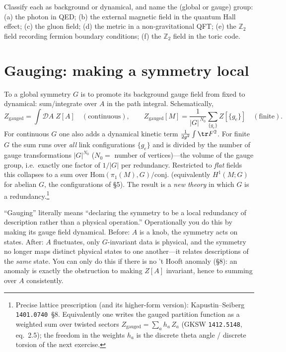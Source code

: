 \documentclass[11pt]{article}
\newcommand{\Ztwo}{\mathbb{Z}_2}
\begin{document}
\begin{xca}
Classify each as background or dynamical, and name the (global or gauge) group:
(a) the photon in QED; (b) the external magnetic field in the quantum Hall effect;
(c) the gluon field; (d) the metric in a non-gravitational QFT; (e) the $\Ztwo$ field
recording fermion boundary conditions; (f) the $\Ztwo$ field in the toric code.
\end{xca}

\section{Gauging: making a symmetry local}

\begin{ddefinition}[Gauging]
To  a global symmetry $G$ is to promote its background gauge field from
fixed to dynamical: sum/integrate over $A$ in the path integral. Schematically,
\[
Z_{\text{gauged}} = \int \mathcal D A \; Z[A]
\quad(\text{continuous}),
\qquad
Z_{\text{gauged}}[M] = \frac{1}{|G|^{\,N_0}}\sum_{\{g_e\}} Z[\{g_e\}]
\quad(\text{finite}).
\]
For continuous $G$ one also adds a dynamical kinetic term $\frac1{2g^2}\int\tr F^2$. For
finite $G$ the sum runs over \emph{all} link configurations $\{g_e\}$ and is divided by
the number of gauge transformations $|G|^{N_0}$ ($N_0=$ number of vertices)---the volume
of the gauge group, i.e.\ exactly one factor of $1/|G|$ per redundancy. Restricted to
\emph{flat} fields this collapses to a sum over $\mathrm{Hom}(\pi_1(M),G)/\text{conj.}$
(equivalently $H^1(M;G)$ for abelian $G$, the configurations of \S5). The result is a
\emph{new theory} in which $G$ is a redundancy.\footnote{Precise lattice prescription
(and its higher-form version): Kapustin--Seiberg \texttt{1401.0740}~\S8. Equivalently
one writes the gauged partition function as a weighted sum over twisted sectors
$Z_{\text{gauged}}=\sum_a h_a\,Z_a$ (GKSW \texttt{1412.5148}, eq.~2.5); the freedom in
the weights $h_a$ is the discrete theta angle / discrete torsion of the next exercise.}
\end{ddefinition}

\begin{iintuition}
``Gauging'' literally means ``declaring the symmetry to be a local redundancy of
description rather than a physical operation.'' Operationally you do this by making its
gauge field dynamical. Before: $A$ is a knob, the symmetry acts on states. After: $A$
fluctuates, only $G$-invariant data is physical, and the symmetry no longer maps
distinct physical states to one another---it relates descriptions of the \emph{same}
state. You can only do this if there is no 't Hooft anomaly (\S8): an anomaly is exactly
the obstruction to making $Z[A]$ invariant, hence to summing over $A$ consistently.
\end{iintuition}
\end{document}
